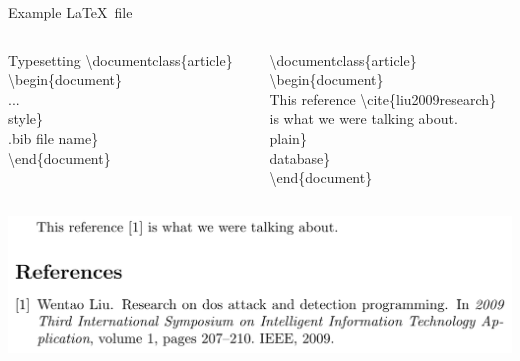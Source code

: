 \documentclass[10pt,xcolor={dvipsnames}]{beamer}
\begin{document}
		\begin{frame}{Example \LaTeX~file}
			\begin{columns}[T]
				
				\begin{column}{.5 \textwidth}
					\onslide<2->
					\begin{block}{Typesetting}
						\textbackslash documentclass\{{\color{blue}article}\}\\
						\textbackslash begin\{{\color{blue}document}\}\\
						
							\quad...\\
							style{\color{orange}\}}\\
							.bib file name{\color{orange}\}}\\
						
						\textbackslash end\{{\color{blue}document}\}\\
					\end{block}
					
				\end{column}
				
				\begin{column}{.5 \textwidth}
					\begin{example}
						\textbackslash documentclass\{{\color{blue}article}\}\\
						\textbackslash begin\{{\color{blue}document}\}\\
						
						\quad This reference {\color{orange}\textbackslash cite\{}liu2009research{\color{orange}\}}\\
						\quad is what we were talking about.\\
						plain{\color{orange}\}}\\
						database{\color{orange}\}}\\
						
						\textbackslash end\{{\color{blue}document}\}\\
					\end{example}
					
				\end{column}
			\end{columns}
		
			\vspace{.2cm}
			\includegraphics[width=1\textwidth]{Images/reference2.png}
		\end{frame}
\end{document}
